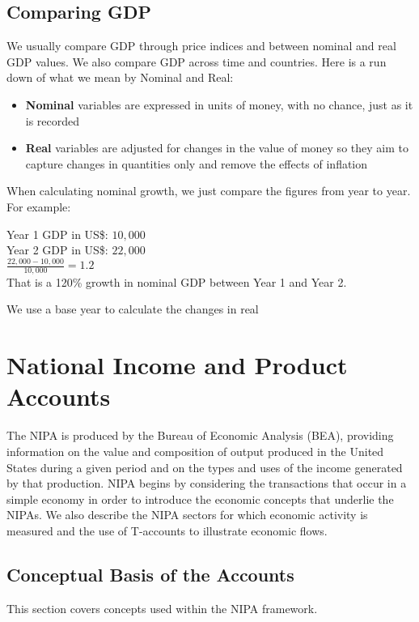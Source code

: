 \documentclass[12pt, letterpaper]{article}
\begin{document}
{\subsection{Comparing GDP}
We usually compare GDP through price indices and between nominal and real GDP values. We also compare GDP across time and countries. Here is a run down of what we mean by Nominal and Real:
\begin{itemize}
	\item \textbf{Nominal} variables are expressed in units of money, with no chance, just as it is recorded
	\item \textbf{Real} variables are adjusted for changes in the value of money so they aim to capture changes in quantities only and remove the effects of inflation
\end{itemize}
When calculating nominal growth, we just compare the figures from year to year. For example:
\begin{center}
	Year 1 GDP in US\$: $10,000$\\
	Year 2 GDP in US\$: $22,000$\\
	$\frac{22,000-10,000}{10,000} = 1.2$\\
	That is a 120\% growth in nominal GDP between Year 1 and Year 2.
\end{center}

We use a base year to calculate the changes in real 

\appendix

\section{National Income and Product Accounts}
The NIPA is produced by the Bureau of Economic Analysis (BEA), providing information on the value and composition of output produced in the United States during a given period and on the types and uses of the income generated by that production. NIPA begins by considering the transactions that occur in a simple economy in order to introduce the economic concepts that underlie the NIPAs. We also describe the NIPA sectors for which economic activity is measured and the use of T-accounts to illustrate economic flows.

\subsection{Conceptual Basis of the Accounts}
This section covers concepts used within the NIPA framework.
}
\end{document}
